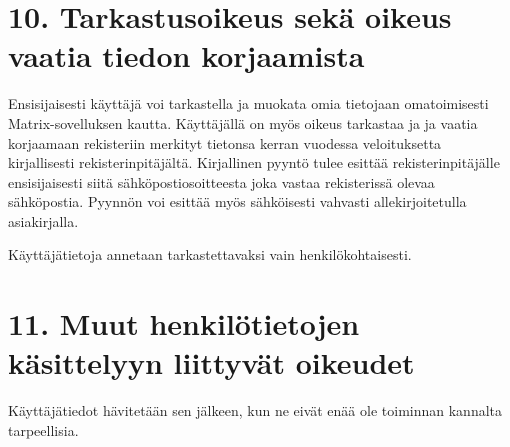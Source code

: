 \documentclass[a4paper]{vakioasiakirja}
\begin{document}
\section{10. Tarkastusoikeus sekä oikeus vaatia tiedon korjaamista}\align
Ensisijaisesti käyttäjä voi tarkastella ja muokata omia tietojaan omatoimisesti Matrix-sovelluksen kautta. Käyttäjällä on myös oikeus tarkastaa ja ja vaatia korjaamaan rekisteriin merkityt tietonsa kerran vuodessa veloituksetta kirjallisesti rekisterinpitäjältä. Kirjallinen pyyntö tulee esittää rekisterinpitäjälle ensisijaisesti siitä sähköpostiosoitteesta joka vastaa rekisterissä olevaa sähköpostia. Pyynnön voi esittää myös sähköisesti vahvasti allekirjoitetulla asiakirjalla.

Käyttäjätietoja annetaan tarkastettavaksi vain henkilökohtaisesti.

\section{11. Muut henkilötietojen käsittelyyn liittyvät oikeudet}\align
Käyttäjätiedot hävitetään sen jälkeen, kun ne eivät enää ole toiminnan kannalta tarpeellisia.

\nopagenum
\end{document}
